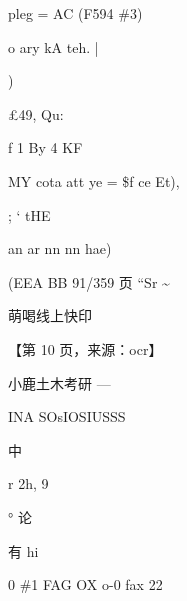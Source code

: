 \documentclass[UTF8,12pt,a4paper,openany]{ctexbook}
\begin{document}
\begin{enumerate}[label=\textbf{\arabic*.},leftmargin=2em]
pleg = AC (F594 \#3)\par o ary kA teh.               |\par )\par £49, Qu:\par f      1 By    4        KF\par MY cota att ye = \$f ce Et),\par ; ‘                tHE\par an ar nn nn hae)\par (EEA BB 91/359 页                           “Sr \textasciitilde{}\par 萌喝线上快印\par \par 【第 10 页，来源：ocr】\par 小鹿土木考研                 —\par INA SOsIOSIUSSS\par 中\par r      2h,              9\par °         论\par 有                   hi\par 0 \#1 FAG OX o-0  fax 22
\end{enumerate}
\end{document}
